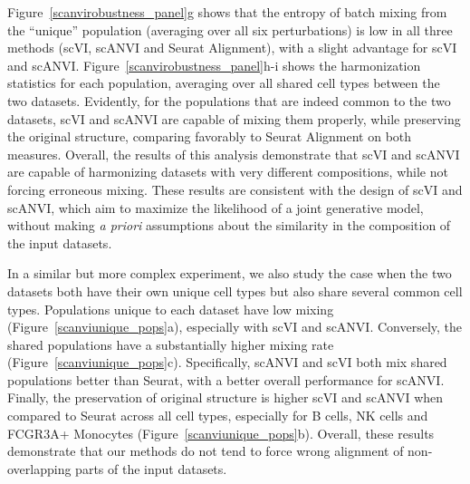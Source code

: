 Figure~\ref{scanvirobustness_panel}g shows that the entropy of batch mixing from the ``unique'' population (averaging over all six perturbations) is low in all three methods (scVI, scANVI and Seurat Alignment), with a slight advantage for scVI and scANVI. Figure~\ref{scanvirobustness_panel}h-i shows the harmonization statistics for each population, averaging over all shared cell types between the two datasets. Evidently, for the populations that are indeed common to the two datasets, scVI and scANVI are capable of mixing them properly, while preserving the original structure, comparing favorably to Seurat Alignment on both measures. Overall, the results of this analysis demonstrate that scVI and scANVI are capable of harmonizing datasets with very different compositions, while not forcing erroneous mixing. These results are consistent with the design of scVI and scANVI, which aim to maximize the likelihood of a joint generative model, without making \textit{a priori} assumptions about the similarity in the composition of the input datasets.

In a similar but more complex experiment, we also study the case when the two datasets both have their own unique cell types but also share several common cell types. Populations unique to each dataset have low mixing (Figure~\ref{scanviunique_pops}a), especially with scVI and scANVI. Conversely, the shared populations have a substantially higher mixing rate (Figure~\ref{scanviunique_pops}c). Specifically, scANVI and scVI both mix shared populations better than Seurat, with a better overall performance for scANVI. Finally, the preservation of original structure is higher scVI and scANVI when compared to Seurat across all cell types, especially for B cells, NK cells and FCGR3A+ Monocytes (Figure~\ref{scanviunique_pops}b). Overall, these results demonstrate that our methods do not tend to force wrong alignment of non-overlapping parts of the input datasets.


